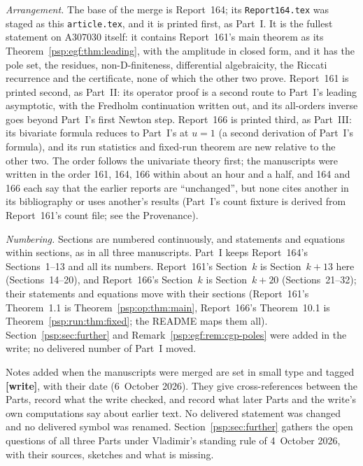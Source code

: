 \documentclass[11pt,letterpaper]{article}
\numberwithin{equation}{section}
\theoremstyle{remark}\newtheorem{remark}[theorem]{Remark}
\newcommand{\file}[1]{\nolinkurl{#1}}
\begin{document}
\emph{Arrangement.} The base of the merge is Report~164; its \file{Report164.tex} was staged as this \file{article.tex}, and it is printed first, as Part~I. It is the fullest statement on A307030 itself: it contains Report~161's main theorem as its Theorem~\ref{psp:egf:thm:leading}, with the amplitude in closed form, and it has the pole set, the residues, non-D-finiteness, differential algebraicity, the Riccati recurrence and the certificate, none of which the other two prove. Report~161 is printed second, as Part~II: its operator proof is a second route to Part~I's leading asymptotic, with the Fredholm continuation written out, and its all-orders inverse goes beyond Part~I's first Newton step. Report~166 is printed third, as Part~III: its bivariate formula reduces to Part~I's at $u=1$ (a second derivation of Part~I's formula), and its run statistics and fixed-run theorem are new relative to the other two. The order follows the univariate theory first; the manuscripts were written in the order 161, 164, 166 within about an hour and a half, and 164 and 166 each say that the earlier reports are ``unchanged'', but none cites another in its bibliography or uses another's results (Part~I's count fixture is derived from Report~161's count file; see the Provenance).

\emph{Numbering.} Sections are numbered continuously, and statements and equations within sections, as in all three manuscripts. Part~I keeps Report~164's Sections~1--13 and all its numbers. Report~161's Section~$k$ is Section~$k+13$ here (Sections~14--20), and Report~166's Section~$k$ is Section~$k+20$ (Sections~21--32); their statements and equations move with their sections (Report~161's Theorem~1.1 is Theorem~\ref{psp:op:thm:main}, Report~166's Theorem~10.1 is Theorem~\ref{psp:run:thm:fixed}; the README maps them all). Section~\ref{psp:sec:further} and Remark~\ref{psp:egf:rem:cgp-poles} were added in the write; no delivered number of Part~I moved.

Notes added when the manuscripts were merged are set in small type and tagged \textbf{[write]}, with their date (6~October 2026). They give cross-references between the Parts, record what the write checked, and record what later Parts and the write's own computations say about earlier text. No delivered statement was changed and no delivered symbol was renamed. Section~\ref{psp:sec:further} gathers the open questions of all three Parts under Vladimir's standing rule of 4~October 2026, with their sources, sketches and what is missing.
\end{document}
